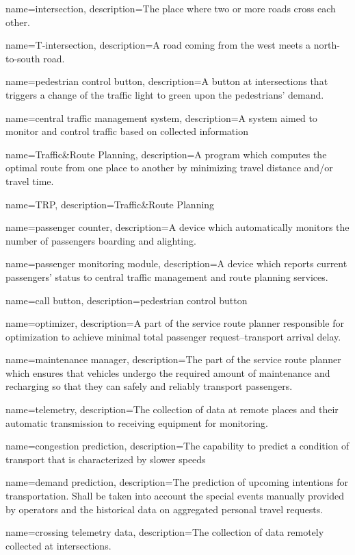 {%
	name={intersection},
	description={The place where two or more roads cross each other.}
}

{%
	name={T-intersection},
	description={A road coming from the west meets a north-to-south road.}
}

{%
	name={pedestrian control button},
	description={A button at intersections that triggers a change of the
	traffic light to green upon the pedestrians’ demand.}
}

{%
	name={central traffic management system},
	description={A system aimed to monitor and control traffic based on
	collected information}
}

{%
	name={Traffic\&Route Planning},
	description={A program which computes the optimal route from one place
	to another by minimizing travel distance and/or travel time.}
}

{%
	name={TRP},
	description={Traffic\&Route Planning}
}

{%
	name={passenger counter},
	description={A device which automatically monitors the number of
	passengers boarding and alighting.}
}

{%
	name={passenger monitoring module},
	description={A device which reports current passengers’ status to
	central traffic management and route planning services.}
}

{%
	name={call button},
	description={pedestrian control button}
}

{%
	name={optimizer},
	description={A part of the service route planner responsible for
	optimization to achieve minimal total passenger request–transport
	arrival delay.}
}

{%
	name={maintenance manager},
	description={The part of the service route planner which ensures that
	vehicles undergo the required amount of maintenance and recharging so
	that they can safely and reliably transport passengers.}
}

{%
	name={telemetry},
	description={The collection of data at remote places and their automatic
	transmission to receiving equipment for monitoring.}
}

{%
	name={congestion prediction},
	description={The capability to predict a condition of transport that is
	characterized by slower speeds}
}

{%
	name={demand prediction},
	description={The prediction of upcoming intentions for transportation.
	Shall be taken into account the special events manually provided by
	operators and the historical data on aggregated personal travel
	requests.}
}

{%
	name={crossing telemetry data},
	description={The collection of data remotely collected at
	intersections.}
}

